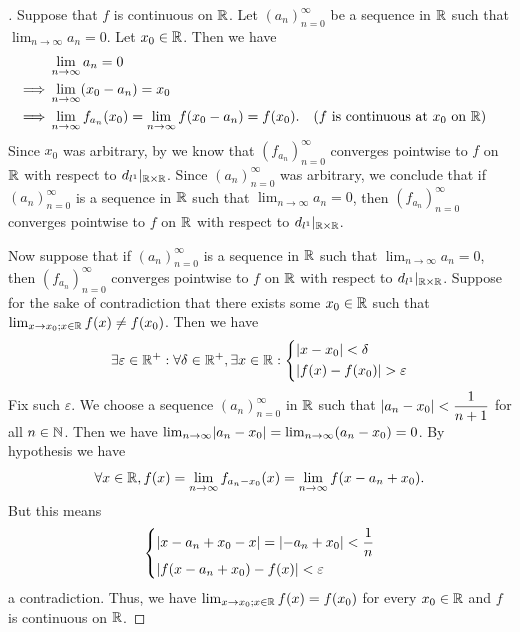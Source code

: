 \begin{proof}[]
  Suppose that \(f\) is continuous on \(\mathbb{R}\).
  Let \((a_n)_{n = 0}^\infty\) be a sequence in \(\mathbb{R}\) such that \(\lim_{n \to \infty} a_n = 0\).
  Let \(x_0 \in \mathbb{R}\).
  Then we have
  \begin{align*}
             & \lim_{n \to \infty} a_n = 0                                                                                                          \\
    \implies & \lim_{n \to \infty} (x_0 - a_n) = x_0                                                                                                \\
    \implies & \lim_{n \to \infty} f_{a_n}(x_0) = \lim_{n \to \infty} f(x_0 - a_n) = f(x_0). &  & \text{(\(f\) is continuous at \(x_0\) on \(\mathbb{R}\))}
  \end{align*}
  Since \(x_0\) was arbitrary, by  we know that \((f_{a_n})_{n = 0}^\infty\) converges pointwise to \(f\) on \(\mathbb{R}\) with respect to \(d_{l^1}|_{\mathbb{R} \times \mathbb{R}}\).
  Since \((a_n)_{n = 0}^\infty\) was arbitrary, we conclude that if \((a_n)_{n = 0}^\infty\) is a sequence in \(\mathbb{R}\) such that \(\lim_{n \to \infty} a_n = 0\), then \((f_{a_n})_{n = 0}^\infty\) converges pointwise to \(f\) on \(\mathbb{R}\) with respect to \(d_{l^1}|_{\mathbb{R} \times \mathbb{R}}\).

  Now suppose that if \((a_n)_{n = 0}^\infty\) is a sequence in \(\mathbb{R}\) such that \(\lim_{n \to \infty} a_n = 0\), then \((f_{a_n})_{n = 0}^\infty\) converges pointwise to \(f\) on \(\mathbb{R}\) with respect to \(d_{l^1}|_{\mathbb{R} \times \mathbb{R}}\).
  Suppose for the sake of contradiction that there exists some \(x_0 \in \mathbb{R}\) such that \(\lim_{x \to x_0 ; x \in \mathbb{R}} f(x) \neq f(x_0)\).
  Then we have
  \[
    \exists \varepsilon \in \mathbb{R}^+ : \forall \delta \in \mathbb{R}^+, \exists x \in \mathbb{R} : \begin{dcases}
      \left\lvert x - x_0\right\rvert < \delta \\
      \left\lvert f(x) - f(x_0)\right\rvert > \varepsilon
    \end{dcases}
  \]
  Fix such \(\varepsilon\).
  We choose a sequence \((a_n)_{n = 0}^\infty\) in \(\mathbb{R}\) such that \(\left\lvert a_n - x_0\right\rvert < \dfrac{1}{n + 1}\) for all \(n \in \mathbb{N}\).
  Then we have \(\lim_{n \to \infty} \abs{a_n - x_0} = \lim_{n \to \infty} (a_n - x_0) = 0\).
  By hypothesis we have
  \[
    \forall x \in \mathbb{R}, f(x) = \lim_{n \to \infty} f_{a_n - x_0}(x) = \lim_{n \to \infty} f(x - a_n + x_0).
  \]
  But this means
  \[
    \begin{dcases}
      \left\lvert x - a_n + x_0 - x\right\rvert = \left\lvert-a_n + x_0\right\rvert < \dfrac{1}{n} \\
      \left\lvert f(x - a_n + x_0) - f(x)\right\rvert < \varepsilon
    \end{dcases}
  \]
  a contradiction.
  Thus, we have \(\lim_{x \to x_0 ; x \in \mathbb{R}} f(x) = f(x_0)\) for every \(x_0 \in \mathbb{R}\) and \(f\) is continuous on \(\mathbb{R}\).
\end{proof}

